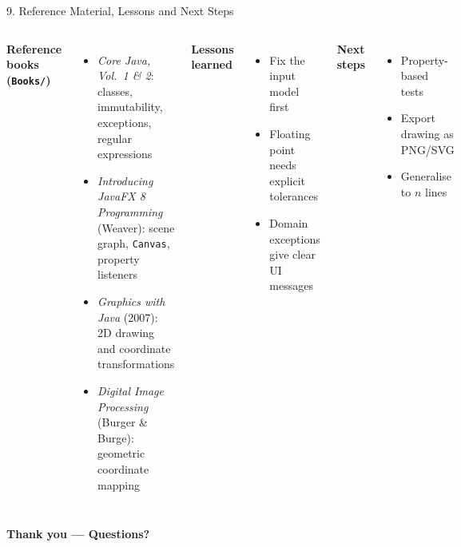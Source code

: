 \documentclass[aspectratio=169,11pt]{beamer}
\begin{document}
\begin{frame}{9. Reference Material, Lessons and Next Steps}
  \small
  \begin{columns}[T]
      \textbf{Reference books (\texttt{Books/})}
      \begin{itemize}
        \item \emph{Core Java, Vol.~1 \& 2}: classes, immutability, exceptions, regular expressions
        \item \emph{Introducing JavaFX 8 Programming} (Weaver): scene graph, \texttt{Canvas}, property listeners
        \item \emph{Graphics with Java} (2007): 2D drawing and coordinate transformations
        \item \emph{Digital Image Processing} (Burger \& Burge): geometric coordinate mapping
      \end{itemize}
      \textbf{Lessons learned}
      \begin{itemize}
        \item Fix the input model first
        \item Floating point needs explicit tolerances
        \item Domain exceptions give clear UI messages
      \end{itemize}
      \textbf{Next steps}
      \begin{itemize}
        \item Property-based tests
        \item Export drawing as PNG/SVG
        \item Generalise to $n$ lines
      \end{itemize}
  \end{columns}
  \vspace{2mm}
  \centering
  {\large\color{tfxblue}\textbf{Thank you --- Questions?}}
\end{frame}
\end{document}
